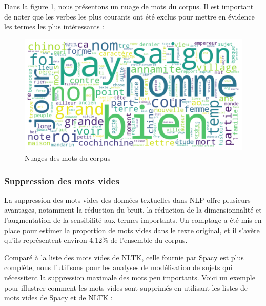 Dans la figure \ref{fig:nuage_corpus}, nous présentons un nuage de mots du corpus. Il est important de noter que les verbes les plus courants ont été exclus pour mettre en évidence les termes les plus intéressants :

\begin{figure}[H]
    \centering
    \includegraphics[width=12cm]{img/2.7.word_cloud_total.png}
    \caption{Nuages des mots du corpus}
    \label{fig:nuage_corpus}
\end{figure}


\subsubsection{Suppression des mots vides}
La suppression des mots vides des données textuelles dans NLP offre plusieurs avantages, notamment la réduction du bruit, la réduction de la dimensionnalité et l'augmentation de la sensibilité aux termes importants. 
Un comptage a été mis en place pour estimer la proportion de mots vides dans le texte original, et il s'avère qu'ils représentent environ 4.12\% de l'ensemble du corpus.

Comparé à la liste des mots vides de NLTK, celle fournie par Spacy est plus complète, nous l'utilisons pour les analyses de modélisation de sujets qui nécessitent la suppression maximale des mots peu importants. Voici un exemple pour illustrer comment les mots vides sont supprimés en utilisant les listes de mots vides de Spacy et de NLTK :

